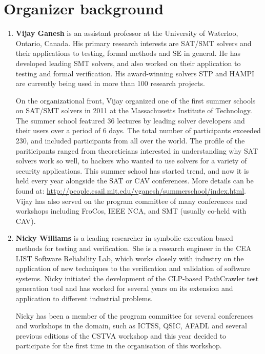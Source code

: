\documentclass{sig-alternate}
\begin{document}
\section{Organizer background}
\vspace{0.2cm}
\begin{enumerate}
\item {\bf Vijay Ganesh} is an assistant professor at the University
  of Waterloo, Ontario, Canada. His primary research interests are
  SAT/SMT solvers and their applications to testing, formal methods
  and SE in general. He has developed leading SMT solvers, and also
  worked on their application to testing and formal verification. His
  award-winning solvers STP and HAMPI are currently being used in more
  than 100 research projects.

  On the organizational front, Vijay organized one of the first summer
  schools on SAT/SMT solvers in 2011 at the Massachusetts Institute of
  Technology. The summer school featured 36 lectures by leading solver
  developers and their users over a period of 6 days. The total number
  of participants exceeded 230, and included participants from all
  over the world. The profile of the pariticipants ranged from
  theoreticians interested in understanding why SAT solvers work so
  well, to hackers who wanted to use solvers for a variety of security
  applications. This summer school has started trend, and now it is
  held every year alongside the SAT or CAV conferences. More details
  can be found at:
  \url{http://people.csail.mit.edu/vganesh/summerschool/index.html}. Vijay
  has also served on the program committee of many conferences and
  workshops including FroCos, IEEE NCA, and SMT (usually co-held with
  CAV).

\item {\bf Nicky Williams} is a leading researcher in symbolic
  execution based methods for testing and verification. She is a
  research engineer in the CEA LIST Software Reliability Lab, which
  works closely with industry on the application of new techniques to
  the verification and validation of software systems. Nicky initiated
  the development of the CLP-based PathCrawler test generation tool
  and has worked for several years on its extension and application to
  different industrial problems.

  Nicky has been a member of the program committee for several
  conferences and workshops in the domain, such as ICTSS, QSIC, AFADL
  and several previous editions of the CSTVA workshop and this year
  decided to participate for the first time in the organisation of
  this workshop.
\end{enumerate}
\end{document}

